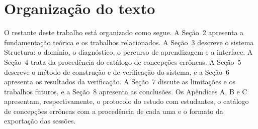 \section{Organização do texto}

O restante deste trabalho está organizado como segue. A Seção~2 apresenta a fundamentação teórica e os trabalhos relacionados. A Seção~3 descreve o sistema Structura: o domínio, o diagnóstico, o percurso de aprendizagem e a interface. A Seção~4 trata da procedência do catálogo de concepções errôneas. A Seção~5 descreve o método de construção e de verificação do sistema, e a Seção~6 apresenta os resultados da verificação. A Seção~7 discute as limitações e os trabalhos futuros, e a Seção~8 apresenta as conclusões. Os Apêndices A, B e C apresentam, respectivamente, o protocolo do estudo com estudantes, o catálogo de concepções errôneas com a procedência de cada uma e o formato da exportação das sessões.
